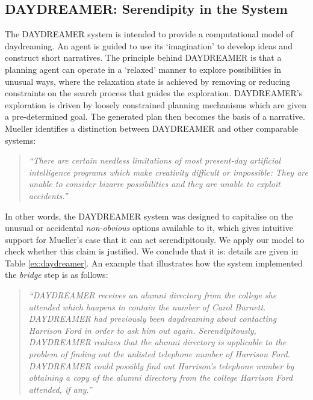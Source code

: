 \subsection{{\sf DAYDREAMER}: Serendipity in the System}
The {\sf DAYDREAMER} system \cite{mueller1990} is intended to provide a computational model of daydreaming.  An agent is guided to use its `imagination' to develop ideas and construct short narratives.  The principle behind {\sf DAYDREAMER} is that a planning agent can operate in a `relaxed' manner to explore possibilities in unusual ways, where the relaxation state is achieved by removing or reducing constraints on the search process that guides the exploration.  {\sf DAYDREAMER}'s exploration is driven by loosely constrained planning mechanisms which are given a pre-determined goal.
The generated plan then becomes the basis of a narrative.
Mueller identifies a distinction between {\sf DAYDREAMER} and other comparable systems:
\begin{quote}
\emph{``There are certain needless limitations of most present-day
  artificial intelligence programs which make creativity difficult or
  impossible: They are unable to consider bizarre possibilities and
  they are unable to exploit accidents.''} \cite[p. 14]{mueller1990}
\end{quote}
In other words, the {\sf DAYDREAMER} system was designed to capitalise
on the unusual or accidental {\em non-obvious} options available to
it, which gives intuitive support for Mueller's case that it can act
serendipitously.  We apply our model to check whether this claim is
justified.  We conclude that it is: details are given in Table \ref{ex:daydreamer}.
An example that illustrates how the system implemented the \emph{bridge} step is as follows:
\begin{quote}
\emph{``DAYDREAMER receives an alumni directory from the college she attended which haapens to contain the number of Carol Burnett.  DAYDREAMER had previously been daydreaming about contacting Harrison Ford in order to ask him out again.  Serendipitously, DAYDREAMER realizes that the alumni directory is applicable to the problem of finding out the unlisted telephone number of Harrison Ford.  DAYDREAMER could possibly find out Harrison's telephone number by obtaining a copy of the alumni directory from the college Harrison Ford attended, if any.''} \cite[p. 125]{mueller1990}
\end{quote}

